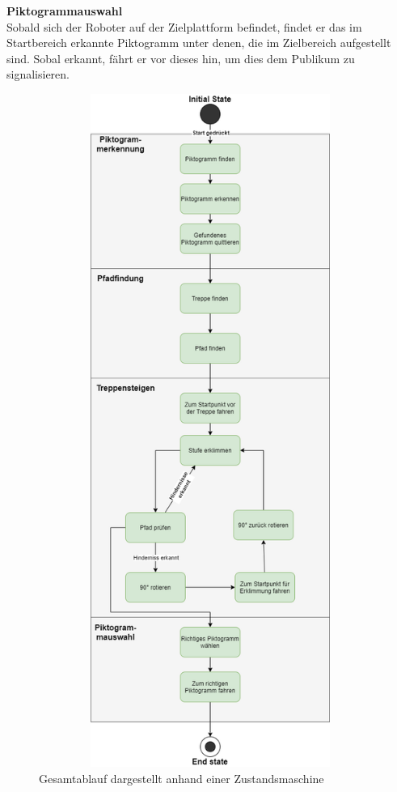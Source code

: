 \textbf{Piktogrammauswahl}\\
Sobald sich der Roboter auf der Zielplattform befindet, findet er das im Startbereich erkannte Piktogramm unter denen, die im Zielbereich aufgestellt sind. Sobal erkannt, fährt er vor dieses hin, um dies dem Publikum zu signalisieren.
\begin{figure}[H]
\begin{center}
    \includegraphics[width=15cm,height=22cm,keepaspectratio]{img/Statemachine.png}
    \caption{Gesamtablauf dargestellt anhand einer Zustandsmaschine}
    \label{fig:gesamtablaufplan}
\end{center}
\end{figure}

